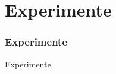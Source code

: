 \section[Problemstellung]{Experimente}
\begin{frame}[<+->]
\frametitle{Experimente}
    
    Experimente

\end{frame}